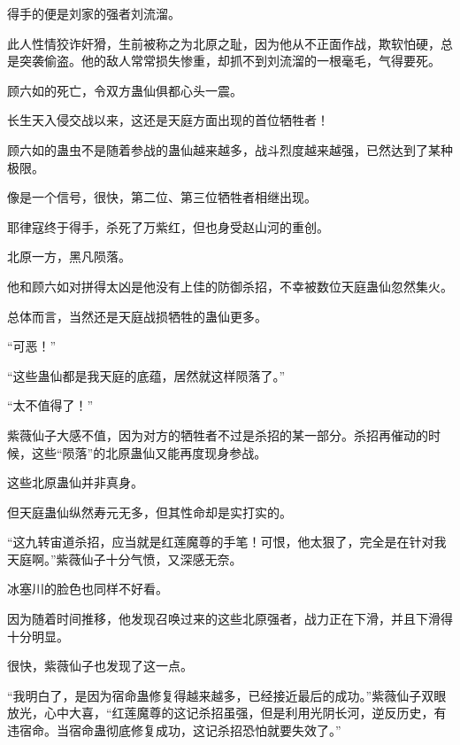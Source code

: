 \begin{this_body}
得手的便是刘家的强者刘流溜。

此人性情狡诈奸猾，生前被称之为北原之耻，因为他从不正面作战，欺软怕硬，总是突袭偷盗。他的敌人常常损失惨重，却抓不到刘流溜的一根毫毛，气得要死。

顾六如的死亡，令双方蛊仙俱都心头一震。

长生天入侵交战以来，这还是天庭方面出现的首位牺牲者！

顾六如的蛊虫不是随着参战的蛊仙越来越多，战斗烈度越来越强，已然达到了某种极限。

像是一个信号，很快，第二位、第三位牺牲者相继出现。

耶律寇终于得手，杀死了万紫红，但也身受赵山河的重创。

北原一方，黑凡陨落。

他和顾六如对拼得太凶是他没有上佳的防御杀招，不幸被数位天庭蛊仙忽然集火。

总体而言，当然还是天庭战损牺牲的蛊仙更多。

“可恶！”

“这些蛊仙都是我天庭的底蕴，居然就这样陨落了。”

“太不值得了！”

紫薇仙子大感不值，因为对方的牺牲者不过是杀招的某一部分。杀招再催动的时候，这些“陨落”的北原蛊仙又能再度现身参战。

这些北原蛊仙并非真身。

但天庭蛊仙纵然寿元无多，但其性命却是实打实的。

“这九转宙道杀招，应当就是红莲魔尊的手笔！可恨，他太狠了，完全是在针对我天庭啊。”紫薇仙子十分气愤，又深感无奈。

冰塞川的脸色也同样不好看。

因为随着时间推移，他发现召唤过来的这些北原强者，战力正在下滑，并且下滑得十分明显。

很快，紫薇仙子也发现了这一点。

“我明白了，是因为宿命蛊修复得越来越多，已经接近最后的成功。”紫薇仙子双眼放光，心中大喜，“红莲魔尊的这记杀招虽强，但是利用光阴长河，逆反历史，有违宿命。当宿命蛊彻底修复成功，这记杀招恐怕就要失效了。”

\end{this_body}

